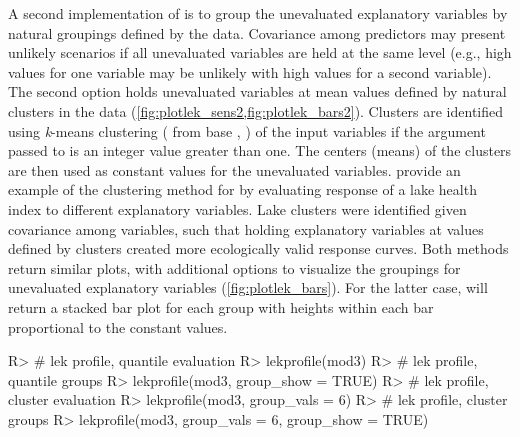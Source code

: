 \documentclass[article,shortnames]{jss}
\begin{document}
A second implementation of  is to group the unevaluated explanatory variables by natural groupings defined by the data. Covariance among predictors may present unlikely scenarios if all unevaluated variables are held at the same level (e.g., high values for one variable may be unlikely with high values for a second variable). The second option holds unevaluated variables at mean values defined by natural clusters in the data (\cref{fig:plotlek_sens2,fig:plotlek_bars2}). Clusters are identified using {\it k}-means clustering ( from base , \citealt{Hartigan79}) of the input variables if the argument passed to  is an integer value greater than one. The centers (means) of the clusters are then used as constant values for the unevaluated variables.  \citet{Beck14a} provide an example of the clustering method for  by evaluating response of a lake health index to different explanatory variables.  Lake clusters were identified given covariance among variables, such that holding explanatory variables at values defined by clusters created more ecologically valid response curves.  Both methods return similar plots, with additional options to visualize the groupings for unevaluated explanatory variables (\cref{fig:plotlek_bars}).  For the latter case,  will return a stacked bar plot for each group with heights within each bar proportional to the constant values.
\begin{Schunk}
\begin{Sinput}
R> # lek profile, quantile evaluation
R> lekprofile(mod3)
R> # lek profile, quantile groups 
R> lekprofile(mod3, group_show = TRUE)
R> # lek profile, cluster evaluation
R> lekprofile(mod3, group_vals = 6)
R> # lek profile, cluster groups
R> lekprofile(mod3, group_vals = 6, group_show = TRUE)
\end{Sinput}
\end{Schunk}
\end{document}
